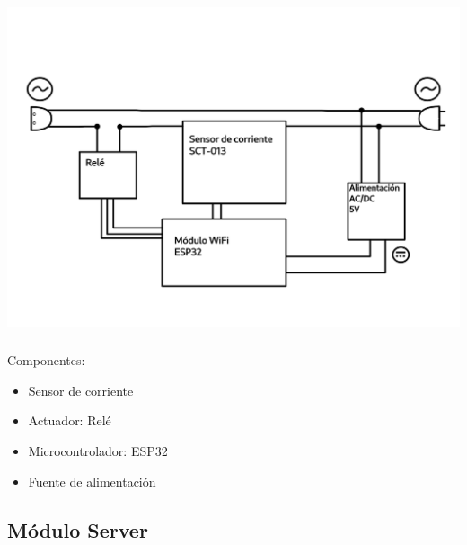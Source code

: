 \documentclass[compress, aspectratio=169]{beamer} %
\begin{document}
\begin{frame}
  \transdissolve[duration=1]
  \frametitle{\insertsubsection}
  \centering\includegraphics[scale=0.7]{img/esquema_enchufe_inteligente.png}
\end{frame}

\begin{frame}
  \transdissolve[duration=1]
  \frametitle{\insertsubsection}
  Componentes:
  \begin{itemize}
  \item{Sensor de corriente}
  \item{Actuador: Relé}
  \item{Microcontrolador: ESP32}
  \item{Fuente de alimentación}
  \end{itemize}
\end{frame}

\subsection{Módulo Server}
\begin{frame}
  \transdissolve[duration=1]
  \frametitle{\insertsubsection}
\end{frame}
\end{document}

